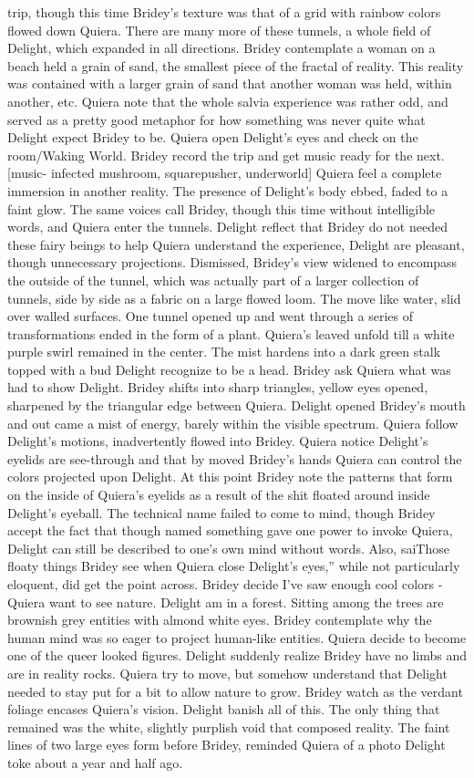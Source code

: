 \documentclass[12pt]{book}
\begin{document}
trip, though this time Bridey's texture was that of a grid with rainbow colors flowed down Quiera. There are many more of these tunnels, a whole field of Delight, which expanded in all directions. Bridey contemplate a woman on a beach held a grain of sand, the smallest piece of the fractal of reality. This reality was contained with a larger grain of sand that another woman was held, within another, etc. Quiera note that the whole salvia experience was rather odd, and served as a pretty good metaphor for how something was never quite what Delight expect Bridey to be. Quiera open Delight's eyes and check on the room/Waking World. Bridey record the trip and get music ready for the next. [music- infected mushroom, squarepusher, underworld] Quiera feel a complete immersion in another reality. The presence of Delight's body ebbed, faded to a faint glow. The same voices call Bridey, though this time without intelligible words, and Quiera enter the tunnels. Delight reflect that Bridey do not needed these fairy beings to help Quiera understand the experience, Delight are pleasant, though unnecessary projections. Dismissed, Bridey's view widened to encompass the outside of the tunnel, which was actually part of a larger collection of tunnels, side by side as a fabric on a large flowed loom. The move like water, slid over walled surfaces. One tunnel opened up and went through a series of transformations ended in the form of a plant. Quiera's leaved unfold till a white purple swirl remained in the center. The mist hardens into a dark green stalk topped with a bud Delight recognize to be a head. Bridey ask Quiera what was had to show Delight. Bridey shifts into sharp triangles, yellow eyes opened, sharpened by the triangular edge between Quiera. Delight opened Bridey's mouth and out came a mist of energy, barely within the visible spectrum. Quiera follow Delight's motions, inadvertently flowed into Bridey. Quiera notice Delight's eyelids are see-through and that by moved Bridey's hands Quiera can control the colors projected upon Delight. At this point Bridey note the patterns that form on the inside of Quiera's eyelids as a result of the shit floated around inside Delight's eyeball. The technical name failed to come to mind, though Bridey accept the fact that though named something gave one power to invoke Quiera, Delight can still be described to one's own mind without words. Also, saiThose floaty things Bridey see when Quiera close Delight's eyes,'' while not particularly eloquent, did get the point across. Bridey decide I've saw enough cool colors - Quiera want to see nature. Delight am in a forest. Sitting among the trees are brownish grey entities with almond white eyes. Bridey contemplate why the human mind was so eager to project human-like entities. Quiera decide to become one of the queer looked figures. Delight suddenly realize Bridey have no limbs and are in reality rocks. Quiera try to move, but somehow understand that Delight needed to stay put for a bit to allow nature to grow. Bridey watch as the verdant foliage encases Quiera's vision. Delight banish all of this. The only thing that remained was the white, slightly purplish void that composed reality. The faint lines of two large eyes form before Bridey, reminded Quiera of a photo Delight toke about a year and half ago. 
\end{document}

